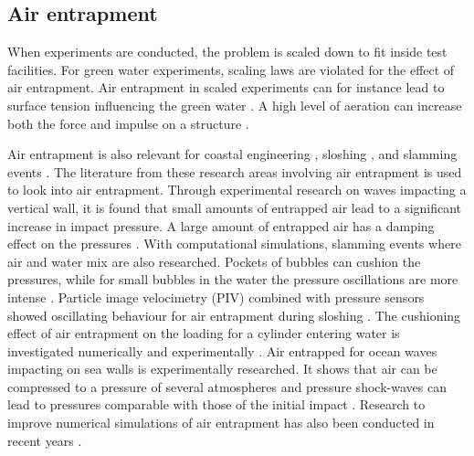 \subsection{Air entrapment}
\label{sec:lit_air_entrapment}

When experiments are conducted, the problem is scaled down to fit inside test facilities. 
For green water experiments, scaling laws are violated for the effect of air entrapment. Air entrapment in scaled experiments can for instance lead to surface tension influencing the green water \cite{Greco2005}. 
A high level of aeration can increase both the force and impulse on a structure \cite{Ariyarathne2012}. 
\par 
Air entrapment is also relevant for coastal engineering \cite{Chan1994}, sloshing \cite{Lugni2006}, and slamming events \cite{Guzel2019}. The literature from these research areas involving air entrapment is used to look into air entrapment. Through experimental research on waves impacting a vertical wall, it is found that small amounts of entrapped air lead to a significant increase in impact pressure. A large amount of entrapped air has a damping effect on the pressures \cite{Hattori1994}. With computational simulations, slamming events where air and water mix are also researched. Pockets of bubbles can cushion the pressures, while for small bubbles in the water the pressure oscillations are more intense \cite{Sun2019}. Particle image velocimetry (PIV) combined with pressure sensors showed oscillating behaviour for air entrapment during sloshing \cite{Lugni2006}. The cushioning effect of air entrapment on the loading for a cylinder entering water is investigated numerically and experimentally \cite{Guzel2019}. Air entrapped for ocean waves impacting on sea walls is experimentally researched. It shows that air can be compressed to a pressure of several atmospheres and pressure shock-waves can lead to pressures comparable with those of the initial impact \cite{Bredmose2009}. Research to improve numerical simulations of air entrapment has also been conducted in recent years \cite{Sun2019, VanDerEijk2020}.


